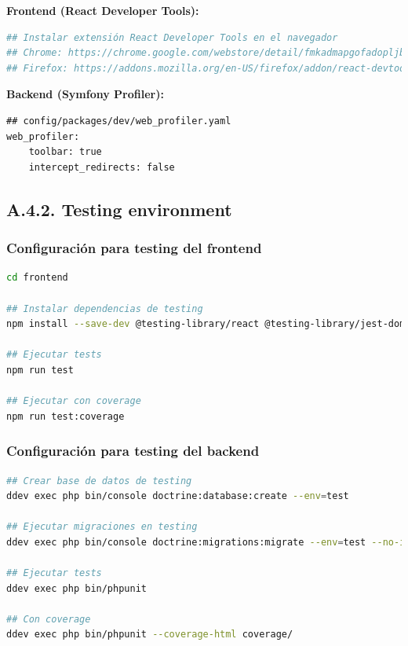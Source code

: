 \documentclass[12pt,a4paper,oneside]{report}
\begin{document}
\textbf{Frontend (React Developer Tools):}

\begin{lstlisting}[language=bash]
## Instalar extensión React Developer Tools en el navegador
## Chrome: https://chrome.google.com/webstore/detail/fmkadmapgofadopljbjfkapdkoienihi
## Firefox: https://addons.mozilla.org/en-US/firefox/addon/react-devtools/
\end{lstlisting}

\textbf{Backend (Symfony Profiler):}

\begin{lstlisting}
## config/packages/dev/web_profiler.yaml
web_profiler:
    toolbar: true
    intercept_redirects: false
\end{lstlisting}

\subsection{A.4.2. Testing
environment}\label{a.4.2.-testing-environment}

\subsubsection{Configuración para testing del
frontend}\label{configuraciuxf3n-para-testing-del-frontend}

\begin{lstlisting}[language=bash]
cd frontend

## Instalar dependencias de testing
npm install --save-dev @testing-library/react @testing-library/jest-dom vitest

## Ejecutar tests
npm run test

## Ejecutar con coverage
npm run test:coverage
\end{lstlisting}

\subsubsection{Configuración para testing del
backend}\label{configuraciuxf3n-para-testing-del-backend}

\begin{lstlisting}[language=bash]
## Crear base de datos de testing
ddev exec php bin/console doctrine:database:create --env=test

## Ejecutar migraciones en testing
ddev exec php bin/console doctrine:migrations:migrate --env=test --no-interaction

## Ejecutar tests
ddev exec php bin/phpunit

## Con coverage
ddev exec php bin/phpunit --coverage-html coverage/
\end{lstlisting}
\end{document}
